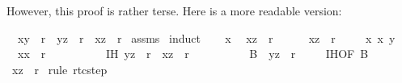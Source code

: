 \begin{isabellebody}
\begin{isamarkuptext}
However, this proof is rather terse. Here is a more readable version:%
\end{isamarkuptext}%
\isamarkuptrue%
\isamarkupfalse%
\ \ {\isachardoublequoteopen}{\isacharparenleft}x{\isacharcomma}y{\isacharparenright}\ {\isasymin}\ r{\isacharasterisk}{\isachardoublequoteclose}\ \ {\isachardoublequoteopen}{\isacharparenleft}y{\isacharcomma}z{\isacharparenright}\ {\isasymin}\ r{\isacharasterisk}{\isachardoublequoteclose}\ \ {\isachardoublequoteopen}{\isacharparenleft}x{\isacharcomma}z{\isacharparenright}\ {\isasymin}\ r{\isacharasterisk}{\isachardoublequoteclose}\isanewline
%
\isadelimproof
%
\endisadelimproof
%
\isatagproof
{}\isamarkupfalse%
\ assms\isanewline
{}\isamarkupfalse%
\ induct\isanewline
\ \ \isamarkupfalse%
\ x\ \isamarkupfalse%
\ {\isachardoublequoteopen}{\isacharparenleft}x{\isacharcomma}z{\isacharparenright}\ {\isasymin}\ r{\isacharasterisk}{\isachardoublequoteclose}\ \ %
\isanewline
\ \ \isamarkupfalse%
\ {\isachardoublequoteopen}{\isacharparenleft}x{\isacharcomma}z{\isacharparenright}\ {\isasymin}\ r{\isacharasterisk}{\isachardoublequoteclose}\ \isacommand{{\isachardot}}\isamarkupfalse%
\isanewline
{}\isamarkupfalse%
\isanewline
\ \ \isamarkupfalse%
\ x{\isacharprime}\ x\ y\isanewline
\ \ \isamarkupfalse%
\ {}{\isacharcolon}\ {\isachardoublequoteopen}{\isacharparenleft}x{\isacharprime}{\isacharcomma}x{\isacharparenright}\ {\isasymin}\ r{\isachardoublequoteclose}\ \isanewline
\ \ \ \ \ \ \ \ \ IH{\isacharcolon}\ {\isachardoublequoteopen}{\isacharparenleft}y{\isacharcomma}z{\isacharparenright}\ {\isasymin}\ r{\isacharasterisk}\ {\isasymLongrightarrow}\ {\isacharparenleft}x{\isacharcomma}z{\isacharparenright}\ {\isasymin}\ r{\isacharasterisk}{\isachardoublequoteclose}\ \isanewline
\ \ \ \ \ \ \ \ \ B{\isacharcolon}\ \ {\isachardoublequoteopen}{\isacharparenleft}y{\isacharcomma}z{\isacharparenright}\ {\isasymin}\ r{\isacharasterisk}{\isachardoublequoteclose}\isanewline
\ \ \isamarkupfalse%
\ {}\ IH{\isacharbrackleft}OF\ B{\isacharbrackright}\ \isamarkupfalse%
\ {\isachardoublequoteopen}{\isacharparenleft}x{\isacharprime}{\isacharcomma}z{\isacharparenright}\ {\isasymin}\ r{\isacharasterisk}{\isachardoublequoteclose}\ \isamarkupfalse%
{\isacharparenleft}rule\ rtc{\isachardot}step{\isacharparenright}\isanewline

\end{isabellebody}
